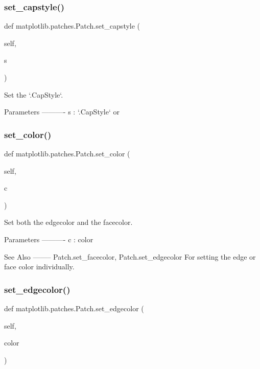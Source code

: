 \subsubsection{\texorpdfstring{set\+\_\+capstyle()}{set\_capstyle()}}
{\footnotesize\ttfamily def matplotlib.\+patches.\+Patch.\+set\+\_\+capstyle (\begin{DoxyParamCaption}\item[{}]{self,  }\item[{}]{s }\end{DoxyParamCaption})}

\begin{DoxyVerb}Set the `.CapStyle`.

Parameters
----------
s : `.CapStyle` or %
\end{DoxyVerb}
 \mbox{\label{classmatplotlib_1_1patches_1_1Patch_a90e30daa7a13e8f5df0c149d3da85d5c}} 
\subsubsection{\texorpdfstring{set\+\_\+color()}{set\_color()}}
{\footnotesize\ttfamily def matplotlib.\+patches.\+Patch.\+set\+\_\+color (\begin{DoxyParamCaption}\item[{}]{self,  }\item[{}]{c }\end{DoxyParamCaption})}

\begin{DoxyVerb}Set both the edgecolor and the facecolor.

Parameters
----------
c : color

See Also
--------
Patch.set_facecolor, Patch.set_edgecolor
    For setting the edge or face color individually.
\end{DoxyVerb}
 \mbox{\label{classmatplotlib_1_1patches_1_1Patch_ad6b45fb45cd1414fc6b9018508bf35f5}} 
\subsubsection{\texorpdfstring{set\+\_\+edgecolor()}{set\_edgecolor()}}
{\footnotesize\ttfamily def matplotlib.\+patches.\+Patch.\+set\+\_\+edgecolor (\begin{DoxyParamCaption}\item[{}]{self,  }\item[{}]{color }\end{DoxyParamCaption})}

